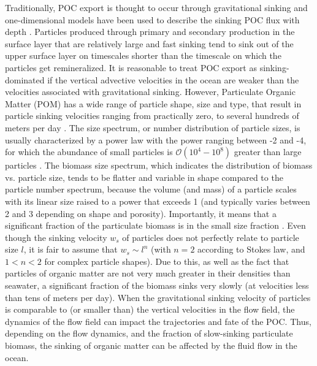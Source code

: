 \documentclass[article,linenumbers]{agujournal2019}
\begin{document}
	Traditionally, POC export is thought to occur through gravitational sinking and one-dimensional models have been used to describe the sinking POC flux with depth \cite{Jackson_1997,Armstrong_2001,DeVries_2014,Omand_2020}. Particles produced through primary and secondary production in the surface layer that are relatively large and fast sinking tend to sink out of the upper surface layer on timescales shorter than the timescale on which the particles get remineralized. It is reasonable to treat POC export as sinking-dominated if the vertical advective velocities in the ocean are weaker than the velocities associated with gravitational sinking. However, Particulate Organic Matter (POM) has a wide range of particle shape, size and type, that result in particle sinking velocities ranging from practically zero, to several hundreds of meters per day \cite{Riley_2012,Baker_2017}. The size spectrum, or number distribution of particle sizes, is usually characterized by a power law with the power ranging between -2 and -4, for which the abundance of small particles is $\mathcal{O}(10^4 - 10^8)$ greater than large particles \cite{McCave_1984,Petrik_2013}. The biomass size spectrum, which indicates the distribution of biomass vs. particle size, tends to be flatter and variable in shape \cite{Sheldon_1972} compared to the particle number spectrum, because the volume (and mass) of a particle scales with its linear size raised to a power that exceeds 1 (and typically varies between 2 and 3 depending on shape and porosity).  Importantly, it means that a significant fraction of the particulate biomass is in the small size fraction \cite{Richardson_2007}. Even though the sinking velocity $w_s$ of particles does not perfectly relate to particle size $l$, it is fair to assume  that  $w_s \sim l^n$ (with $n=2$ according to Stokes law, and $1<n<2$ for complex particle shapes). Due to this, as well as the fact that particles of organic matter are not very much greater in their densities than seawater, a significant fraction of the biomass sinks very slowly (at velocities less than tens of meters per day).  When the gravitational sinking velocity of particles is comparable to (or smaller than) the vertical velocities in the flow field, the dynamics of the flow field can impact the trajectories and fate of the POC.  Thus, depending on the flow dynamics, and the fraction of slow-sinking particulate biomass, the sinking of organic matter can be affected by the fluid flow in the ocean.
\end{document}
